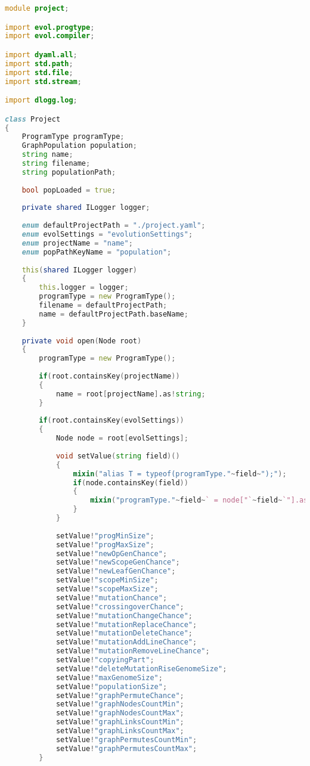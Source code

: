 \documentclass[russian,utf8,emptystyle]{eskdtext}
\begin{document}
\begin{lstlisting}[language=D]
module project;

import evol.progtype;
import evol.compiler;

import dyaml.all;
import std.path;
import std.file;
import std.stream;

import dlogg.log;

class Project
{
    ProgramType programType;
    GraphPopulation population;
    string name;
    string filename;
    string populationPath;
    
    bool popLoaded = true;
    
    private shared ILogger logger;
    
    enum defaultProjectPath = "./project.yaml";
    enum evolSettings = "evolutionSettings";
    enum projectName = "name";
    enum popPathKeyName = "population";
    
    this(shared ILogger logger)
    {
        this.logger = logger;
        programType = new ProgramType();
        filename = defaultProjectPath;
        name = defaultProjectPath.baseName;
    }
    
    private void open(Node root)
    {
    	programType = new ProgramType();
    	
        if(root.containsKey(projectName))
        {
            name = root[projectName].as!string;
        }
        
        if(root.containsKey(evolSettings))
        {
            Node node = root[evolSettings];
            
            void setValue(string field)()
            {
                mixin("alias T = typeof(programType."~field~");");
                if(node.containsKey(field))
                {
                    mixin("programType."~field~` = node["`~field~`"].as!`~T.stringof~";");
                }
            }
            
            setValue!"progMinSize";
            setValue!"progMaxSize";
            setValue!"newOpGenChance";
            setValue!"newScopeGenChance";
            setValue!"newLeafGenChance";
            setValue!"scopeMinSize";
            setValue!"scopeMaxSize";
            setValue!"mutationChance";
            setValue!"crossingoverChance";
            setValue!"mutationChangeChance";
            setValue!"mutationReplaceChance";
            setValue!"mutationDeleteChance";
            setValue!"mutationAddLineChance";
            setValue!"mutationRemoveLineChance";
            setValue!"copyingPart";
            setValue!"deleteMutationRiseGenomeSize";
            setValue!"maxGenomeSize";
            setValue!"populationSize";
            setValue!"graphPermuteChance";
            setValue!"graphNodesCountMin";
            setValue!"graphNodesCountMax";
            setValue!"graphLinksCountMin";
            setValue!"graphLinksCountMax";
            setValue!"graphPermutesCountMin";
            setValue!"graphPermutesCountMax";
        }
        

\end{lstlisting}
\end{document}

